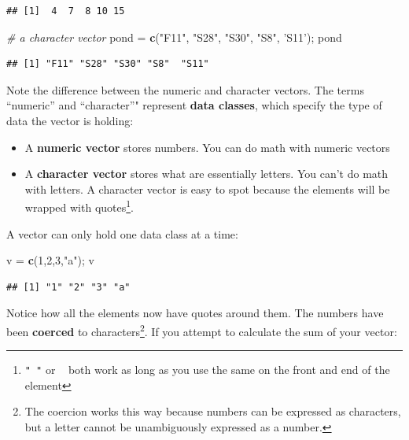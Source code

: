 \documentclass[]{book}
\newenvironment{Shaded}{\begin{snugshade}}{\end{snugshade}}
\newcommand{\KeywordTok}[1]{\textcolor[rgb]{0.13,0.29,0.53}{\textbf{#1}}}
\newcommand{\DecValTok}[1]{\textcolor[rgb]{0.00,0.00,0.81}{#1}}
\newcommand{\StringTok}[1]{\textcolor[rgb]{0.31,0.60,0.02}{#1}}
\newcommand{\CommentTok}[1]{\textcolor[rgb]{0.56,0.35,0.01}{\textit{#1}}}
\newcommand{\NormalTok}[1]{#1}
\providecommand{\tightlist}{%
  \setlength{\itemsep}{0pt}\setlength{\parskip}{0pt}}
\let\rmarkdownfootnote\footnote%
\def\footnote{\protect\rmarkdownfootnote}
\theoremstyle{definition}
\theoremstyle{definition}
\theoremstyle{definition}
\theoremstyle{remark}
\begin{document}
\begin{verbatim}
## [1]  4  7  8 10 15
\end{verbatim}

\begin{Shaded}
\begin{Highlighting}[]
\CommentTok{# a character vector}
\NormalTok{pond =}\StringTok{ }\KeywordTok{c}\NormalTok{(}\StringTok{"F11"}\NormalTok{, }\StringTok{"S28"}\NormalTok{, }\StringTok{"S30"}\NormalTok{, }\StringTok{"S8"}\NormalTok{, }\StringTok{'S11'}\NormalTok{); pond}
\end{Highlighting}
\end{Shaded}

\begin{verbatim}
## [1] "F11" "S28" "S30" "S8"  "S11"
\end{verbatim}

Note the difference between the numeric and character vectors. The terms
``numeric'' and ``character''" represent \textbf{data classes}, which
specify the type of data the vector is holding:

\begin{itemize}
\tightlist
\item
  A \textbf{numeric vector} stores numbers. You can do math with numeric
  vectors
\item
  A \textbf{character vector} stores what are essentially letters. You
  can't do math with letters. A character vector is easy to spot because
  the elements will be wrapped with quotes\footnote{\texttt{"\ "} or
    \texttt{\textquotesingle{}\ \textquotesingle{}} both work as long as
    you use the same on the front and end of the element}.
\end{itemize}

A vector can only hold one data class at a time:

\begin{Shaded}
\begin{Highlighting}[]
\NormalTok{v =}\StringTok{ }\KeywordTok{c}\NormalTok{(}\DecValTok{1}\NormalTok{,}\DecValTok{2}\NormalTok{,}\DecValTok{3}\NormalTok{,}\StringTok{"a"}\NormalTok{); v}
\end{Highlighting}
\end{Shaded}

\begin{verbatim}
## [1] "1" "2" "3" "a"
\end{verbatim}

Notice how all the elements now have quotes around them. The numbers
have been \textbf{coerced} to characters\footnote{The coercion works
  this way because numbers can be expressed as characters, but a letter
  cannot be unambiguously expressed as a number.}. If you attempt to
calculate the sum of your vector:
\end{document}
